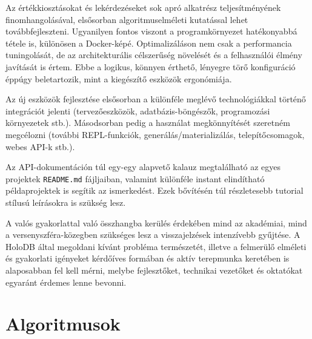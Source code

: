 \documentclass[
    parspace,
    noindent,
    nohyp,
]{elteiktdk}[2023/04/10]
\begin{document}
Az értékkiosztásokat és lekérdezéseket sok apró alkatrész teljesítményének finomhangolásával,
elsősorban algoritmuselméleti kutatással lehet továbbfejleszteni.
Ugyanilyen fontos viszont a programkörnyezet hatékonyabbá tétele is,
különösen a Docker-képé.
Optimalizáláson nem csak a performancia tuningolását,
de az architekturális célszerűség növelését és a felhasználói élmény javítását is értem.
Ebbe a logikus, könnyen érthető, lényegre törő konfiguráció éppúgy beletartozik,
mint a kiegészítő eszközök ergonómiája.

Az új eszközök fejlesztése elsősorban a különféle meglévő technológiákkal történő integrációt jelenti
(tervezőeszközök, adatbázis-böngészők, programozási környezetek stb.).
Másodsorban pedig a használat megkönnyítését szeretném megcélozni
(további REPL-funkciók, generálás/materializálás, telepítőcsomagok, webes API-k stb.).

Az API-dokumentáción túl egy-egy alapvető kalauz megtalálható
az egyes projektek \texttt{README.md} fájljaiban,
valamint különféle instant elindítható példaprojektek is segítik az ismerkedést.
Ezek bővítésén túl részletesebb tutorial stílusú leírásokra is szükség lesz.

A valós gyakorlattal való összhangba kerülés érdekében
mind az akadémiai, mind a versenyszféra-közegben szükséges lesz a visszajelzések
intenzívebb gyűjtése.
A HoloDB által megoldani kívánt probléma természetét,
illetve a felmerülő elméleti és gyakorlati igényeket
kérdőíves formában és aktív terepmunka keretében is alaposabban fel kell mérni,
melybe fejlesztőket, technikai vezetőket és oktatókat egyaránt érdemes lenne bevonni.

\pagebreak


{}
\begin{spacing}{1.05}
\printbibliography[title=\biblabel]
\end{spacing}
\cleardoublepage


\appendix

\chapter{Algoritmusok}

{}
\end{document}
